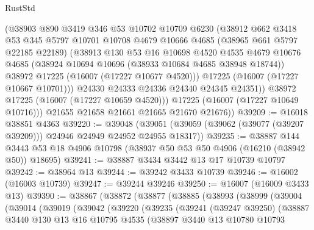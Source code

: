 \begin{lexlean}{RustStd}
\begin{coremodule}
              (@38903
                @890
                @3419
                @346
                @53
                @10702
                @10709
                @6230
                (@38912
                  @662
                  @3418
                  @53
                  @345
                  @5797
                  @10701
                  @10708
                  @4679
                  @10666
                  @4685
                  (@38965 @661 @5797 @22185 @22189)
                  (@38913
                    @130
                    @53
                    @16
                    @10698
                    @4520
                    @4535
                    @4679
                    @10676
                    @4685
                    (@38924 @10694 @10696 (@38933 @10684 @4685 @38948 @18744))
                    @38972
                    @17225
                    (@16007 (@17227 @10677 @4520)))
                  @17225
                  (@16007 (@17227 @10667 @10701)))
                @24330
                @24333
                @24336
                @24340
                @24345
                @24351))
            @38972
            @17225
            (@16007 (@17227 @10659 @4520)))
          @17225
          (@16007 (@17227 @10649 @10716)))
        @21655
        @21658
        @21661
        @21665
        @21670
        @21676))
@39209 := @16018 @38851 @4363
@39220 := @39048
    (@39051 (@39059 (@39062 (@39077 (@39207 @39209))) @24946 @24949 @24952 @24955 @18317))
@39235 := @38887
    @144
    @3443
    @53
    @18
    @4906
    @10798
    (@38937 @50 @53 @50 @4906 (@16210 (@38942 @50)) @18695)
@39241 := @38887 @3434 @3442 @13 @17 @10739 @10797
@39242 := @38964 @13
@39244 := @39242 @3433 @10739
@39246 := @16002 (@16003 @10739)
@39247 := @39244 @39246
@39250 := @16007 (@16009 @3433 @13)
@39390 := @38867
    (@38872
      (@38877
        (@38885
          (@38993
            (@38999
              (@39004
                (@39014
                  (@39019
                    (@39042
                      (@39220
                        (@39235
                          (@39241
                            (@39247 @39250)
                            (@38887
                              @3440
                              @130
                              @13
                              @16
                              @10795
                              @4535
                              (@38897
                                @3440
                                @13
                                @10780
                                @10793

\end{coremodule}
\end{lexlean}
